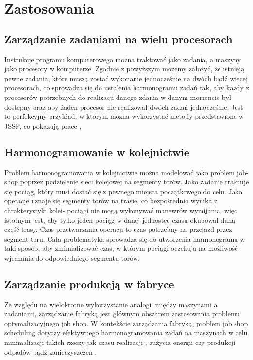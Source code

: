 \documentclass[12pt, a4paper]{report}
\begin{document}
\chapter{Zastosowania}
  \section{Zarządzanie zadaniami na wielu procesorach}
    Instrukcje programu komputerowego można traktować jako zadania, a maszyny jako procesory w komputerze.
    Zgodnie z powyższym możemy założyć, że istnieją pewne zadania, które muszą zostać wykonanie jednocześnie na dwóch bądź więcej procesorach, co
    sprowadza się do ustalenia harmonogramu zadań tak, aby każdy z procesorów potrzebnych do realizacji danego zdania w danym momencie był dostepny oraz 
    aby żaden procesor nie realizował dwóch zadań jednocześnie. Jest to perfekcyjny przykład, w którym można wykorzystać metody przedstawione w JSSP, co pokazują
    prace \cite{jobshop_usage_multiprocessor}, \cite{jobshop_usage_multiprocessor_2} 
    
  \section{Harmonogramowanie w kolejnictwie}
    Problem harmonogramowania w kolejnictwie można modelować jako problem job-shop poprzez podzielenie sieci
    kolejowej na segmenty torów. Jako zadanie traktuje się pociąg, który musi dostać się z pewnego 
    miejsca początkowego do celu. Jako operacje uznaje się segmenty torów na trasie, co bezpośrednio wynika z chrakterystyki kolei- 
    pociągi nie mogą wykonywać manewrów wymijania, więc istotnym jest, aby tylko jeden pociąg w danej jednostce czasu 
    okupował daną część trasy. Czas przetwarzania operacji to czas potrzebny na przejazd przez segment toru. Cała problematyka sprowadza się do utworzenia harmonogramu 
    w taki sposób, aby zmimializować czas, w którym pociągi oczekują na możliwość wjechania do odpowiedniego segmentu torów. \cite{kolejnictwo_jobshop}

  \section{Zarządzanie produkcją w fabryce}
  Ze względu na wielokrotne wykorzystanie analogii między maszynami a zadaniami, zarządzanie fabryką jest głównym obszarem zastosowania problemu optymalizacyjnego job shop. 
  W kontekście zarządzania fabryką,  problem job shop scheduling dotyczy efektywnego harmonogramowania zadań na maszynach w celu minimalizacji 
  takich rzeczy jak czasu realizacji \cite{czas_jobshop}, zużycia energii \cite{energia_jobshop} czy produkcji odpadów bądź zanieczyszczeń \cite{zanieczyszczenia_jobshop}.
\end{document}
